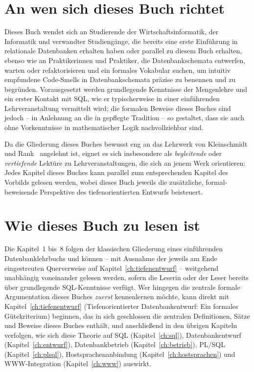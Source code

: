 ﻿\documentclass[a4paper,12pt]{report}
\theoremstyle{definition}
\theoremstyle{remark}
\begin{document}
\section*{An wen sich dieses Buch richtet}

Dieses Buch wendet sich an Studierende der Wirtschaftsinformatik,
der Informatik und verwandter Studiengänge, die bereits eine erste
Einführung in relationale Datenbanken erhalten haben oder parallel
zu diesem Buch erhalten, ebenso wie an Praktikerinnen und Praktiker,
die Datenbankschemata entwerfen, warten oder refaktorisieren und ein
formales Vokabular suchen, um intuitiv empfundene
\glqq Code-Smells\grqq{} in Datenbankschemata präzise zu benennen und
zu begründen. Vorausgesetzt werden grundlegende Kenntnisse der
Mengenlehre und ein erster Kontakt mit SQL, wie er typischerweise in
einer einführenden Lehrveranstaltung vermittelt wird; die formalen
Beweise dieses Buches sind jedoch -- in Anlehnung an die in
\cite{Cormen2009} gepflegte Tradition -- so gestaltet, dass sie auch
ohne Vorkenntnisse in mathematischer Logik nachvollziehbar sind.

Da die Gliederung dieses Buches bewusst eng an das Lehrwerk von
Kleinschmidt und Rank~\cite{Kleinschmidt2002} angelehnt ist, eignet es
sich insbesondere als \emph{begleitende} oder \emph{vertiefende}
Lektüre zu Lehrveranstaltungen, die sich an jenem Werk orientieren:
Jedes Kapitel dieses Buches kann parallel zum entsprechenden Kapitel
des Vorbilds gelesen werden, wobei dieses Buch jeweils die zusätzliche,
formal-beweisende Perspektive des tiefenorientierten Entwurfs
beisteuert.

\section*{Wie dieses Buch zu lesen ist}

Die Kapitel~1 bis~8 folgen der klassischen Gliederung eines
einführenden Datenbanklehrbuchs und können -- mit Ausnahme der jeweils
am Ende eingestreuten Querverweise auf Kapitel~\ref{ch:tiefenentwurf}
-- weitgehend unabhängig voneinander gelesen werden, sofern die
Leserin oder der Leser bereits über grundlegende SQL-Kenntnisse
verfügt. Wer hingegen die zentrale formale Argumentation dieses
Buches \emph{zuerst} kennenlernen möchte, kann direkt mit
Kapitel~\ref{ch:tiefenentwurf} (\glqq Tiefenorientierter
Datenbankentwurf: Ein formales Gütekriterium\grqq{}) beginnen, das in
sich geschlossen die zentralen Definitionen, Sätze und Beweise dieses
Buches enthält, und anschließend in den übrigen Kapiteln verfolgen,
wie sich diese Theorie auf SQL (Kapitel~\ref{ch:sql}),
Datenbankentwurf (Kapitel~\ref{ch:entwurf}), Datenbankbetrieb
(Kapitel~\ref{ch:betrieb}), PL/SQL (Kapitel~\ref{ch:plsql}),
Hostsprachenanbindung (Kapitel~\ref{ch:hostsprachen}) und
WWW-Integration (Kapitel~\ref{ch:www}) auswirkt.
\end{document}
